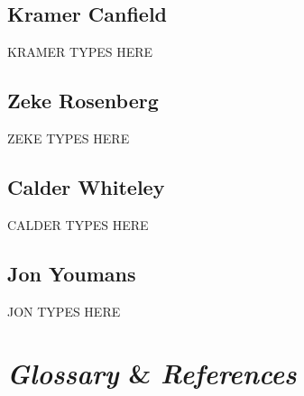 \documentclass[12pt]{article}
\begin{document}
\subsection{Kramer Canfield}
\begin{changemargin}{1cm}{0cm} 
KRAMER TYPES HERE
\end{changemargin} 
\subsection{Zeke Rosenberg}
\begin{changemargin}{1cm}{0cm} 
ZEKE TYPES HERE
\end{changemargin} 
\subsection{Calder Whiteley}
\begin{changemargin}{1cm}{0cm} 
CALDER TYPES HERE
\end{changemargin} 
\subsection{Jon Youmans}
\begin{changemargin}{1cm}{0cm} 
JON TYPES HERE
\end{changemargin} 


\section{\emph{Glossary} \& \emph{References}}
	
\end{document}
